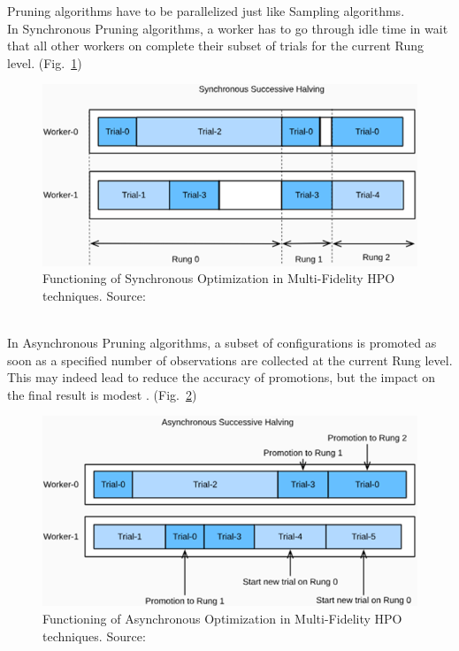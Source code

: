 Pruning algorithms have to be parallelized just like Sampling algorithms.
\\[0.3cm]In Synchronous Pruning algorithms, a worker has to go through idle time in wait that all other workers on complete their subset of trials for the current Rung level. (Fig.~\ref{fig:figure-2.4.2})
\begin{figure}[t]
	\centering
	\includegraphics[width=12cm]{figures/figure-2.4.2.png}
	\caption[Functioning of Synchronous Optimization]{Functioning of Synchronous Optimization in Multi-Fidelity HPO techniques. Source:~\cite{Tesi-1.6}}
	\label{fig:figure-2.4.2}
\end{figure}
\\[0.3cm]In Asynchronous Pruning algorithms, a subset of configurations is promoted as soon as a specified number of observations are collected at the current Rung level. This may indeed lead to reduce the accuracy of promotions, but the impact on the final result is modest \cite{Tesi-1.6}. (Fig.~\ref{fig:figure-2.4.3})
\begin{figure}[t]
	\centering
	\includegraphics[width=12cm]{figures/figure-2.4.3.png}
	\caption[Functioning of Asynchronous Optimization]{Functioning of Asynchronous Optimization in Multi-Fidelity HPO techniques. Source:~\cite{Tesi-1.6}}
	\label{fig:figure-2.4.3}
\end{figure}

